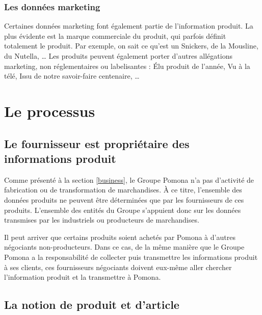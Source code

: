                 \subsubsection{Les données marketing}

                Certaines données marketing font également partie de l'information produit.
                La plus évidente est la marque commerciale du produit, qui parfois définit totalement le produit.
                Par exemple, on sait ce qu'est un Snickers, de la Mousline, du Nutella, \dots
                Les produits peuvent également porter d'autres allégations marketing, non réglementaires ou labelisantes : \'{E}lu produit de l'année, Vu à la télé, Issu de notre savoir-faire centenaire, \dots                

        \section{Le processus}
        
            \subsection{Le fournisseur est propriétaire des informations produit}

            Comme présenté à la section \ref{business}, le Groupe Pomona n'a pas d'activité de fabrication ou de transformation de marchandises.
            \`{A} ce titre, l'ensemble des données produits ne peuvent être déterminées que par les fournisseurs de ces produits.
            L'ensemble des entités du Groupe s'appuient donc sur les données transmises par les industriels ou producteurs de marchandises.

            Il peut arriver que certains produits soient achetés par Pomona à d'autres négociants non-producteurs.
            Dans ce cas, de la même manière que le Groupe Pomona a la responsabilité de collecter puis transmettre les informations produit à ses clients, ces fournisseurs négociants doivent eux-même aller chercher l'information produit et la transmettre à Pomona.


            \subsection{La notion de produit et d'article}

